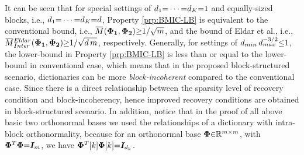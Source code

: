 \begin{remark}
\label{Rmrk:Basic BMIC} 
It can be seen that for special settings of $d_1 {=} \cdots {=} d_K {=} 1$ and equally-sized blocks, i.e., $d_1 {=} \cdots {=} d_K {=} d$, Property \ref{prp:BMIC-LB} is equivalent to the conventional bound, i.e., $\overbar{M}(\myPhiOne,\myPhiTwo) \sgeq 1/\sqrt{m}$, and the bound of Eldar et al., i.e., $\overbar{M}^{Eldar}_{Inter}(\myPhiOne,\myPhiTwo) \sgeq 1/\sqrt{d \, m}$, respectively.
Generally, for settings of $d_{min} \, d_{max}^{-3/2} {\leq} 1$, the lower-bound in Property \ref{prp:BMIC-LB} is less than or equal to the lower-bound in conventional case, which means that in the proposed block-structured scenario, dictionaries can be more \emph{block-incoherent} compared to the conventional case.
Since there is a direct relationship between the sparsity level of recovery condition and block-incoherency, hence improved recovery conditions are obtained in block-structured scenario.
In addition, notice that in the proof of all above basic two orthonormal bases we used the relationships of a dictionary with intra-block orthonormality, because for an orthonormal base $\boldsymbol{\Phi} {\in} \mathbb{R}^{m {\times} m}$, with $\boldsymbol{\Phi}^T \boldsymbol{\Phi} {=} \boldsymbol{I}_{m}$, we have $\boldsymbol{\Phi}^T [k] \boldsymbol{\Phi}[k] {=} \boldsymbol{I}_{d_k}$.
\end{remark}